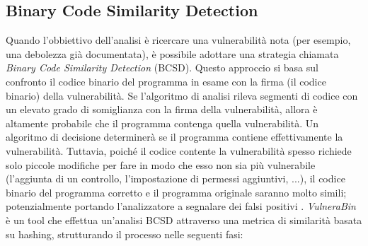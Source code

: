 \documentclass[../main.tex]{subfiles}
\begin{document}
\subsection{Binary Code Similarity Detection}
Quando l'obbiettivo dell'analisi è ricercare una vulnerabilità nota (per esempio, una debolezza già documentata), è possibile adottare una strategia chiamata \textit{Binary Code Similarity Detection} (BCSD).
Questo approccio si basa sul confronto il codice binario del programma in esame con la firma (il codice binario) della vulnerabilità.
Se l'algoritmo di analisi rileva segmenti di codice con un elevato grado di somiglianza con la firma della vulnerabilità, allora è altamente probabile che il programma
contenga quella vulnerabilità. Un algoritmo di decisione determinerà se il programma contiene effettivamente la vulnerabilità.
Tuttavia, poiché il codice contente la vulnerabilità spesso richiede solo piccole modifiche per fare in modo che esso non sia più vulnerabile (l'aggiunta di un controllo, l'impostazione di permessi aggiuntivi, ...), il codice binario del programma corretto e il programma originale
saranno molto simili; potenzialmente portando l'analizzatore a segnalare dei falsi positivi \cite{Survey_of_Binary_Code_Security_Analysis}. \newline
\textit{VulneraBin} \cite{VulneraBin} è un tool che effettua un'analisi BCSD attraverso una metrica di similarità basata su hashing, strutturando il processo nelle seguenti fasi:
\end{document}
